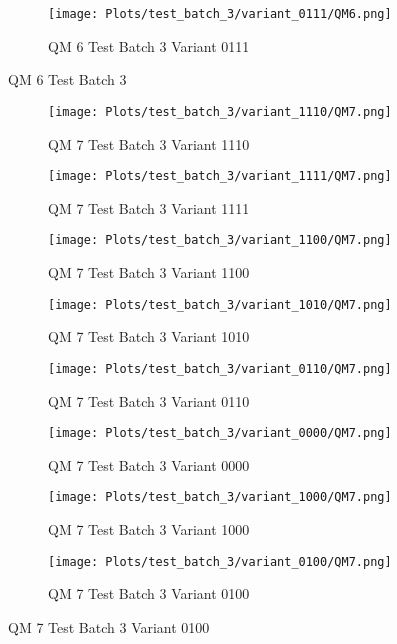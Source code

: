 \documentclass{DissertateFigs}
\begin{document}
\begin{figure}[t!]
\medskip

    \begin{subfigure}{0.47\textwidth}
    \texttt{[image: Plots/test\_batch\_3/variant\_0111/QM6.png]}
    \caption{QM 6 Test Batch 3 Variant 0111}
    \end{subfigure}
\caption{QM 6 Test Batch 3}
    \end{figure}
\clearpage
\begin{figure}[t!]
    \begin{subfigure}{0.47\textwidth}
    \texttt{[image: Plots/test\_batch\_3/variant\_1110/QM7.png]}
    \caption{QM 7 Test Batch 3 Variant 1110}
    \end{subfigure}
    \begin{subfigure}{0.47\textwidth}
    \texttt{[image: Plots/test\_batch\_3/variant\_1111/QM7.png]}
    \caption{QM 7 Test Batch 3 Variant 1111}
    \end{subfigure}

\medskip

    \begin{subfigure}{0.47\textwidth}
    \texttt{[image: Plots/test\_batch\_3/variant\_1100/QM7.png]}
    \caption{QM 7 Test Batch 3 Variant 1100}
    \end{subfigure}
    \begin{subfigure}{0.47\textwidth}
    \texttt{[image: Plots/test\_batch\_3/variant\_1010/QM7.png]}
    \caption{QM 7 Test Batch 3 Variant 1010}
    \end{subfigure}

\medskip

    \begin{subfigure}{0.47\textwidth}
    \texttt{[image: Plots/test\_batch\_3/variant\_0110/QM7.png]}
    \caption{QM 7 Test Batch 3 Variant 0110}
    \end{subfigure}
    \begin{subfigure}{0.47\textwidth}
    \texttt{[image: Plots/test\_batch\_3/variant\_0000/QM7.png]}
    \caption{QM 7 Test Batch 3 Variant 0000}
    \end{subfigure}

\medskip

    \begin{subfigure}{0.47\textwidth}
    \texttt{[image: Plots/test\_batch\_3/variant\_1000/QM7.png]}
    \caption{QM 7 Test Batch 3 Variant 1000}
    \end{subfigure}
    \begin{subfigure}{0.47\textwidth}
    \texttt{[image: Plots/test\_batch\_3/variant\_0100/QM7.png]}
    \caption{QM 7 Test Batch 3 Variant 0100}
    \end{subfigure}


\end{figure}
\end{document}
